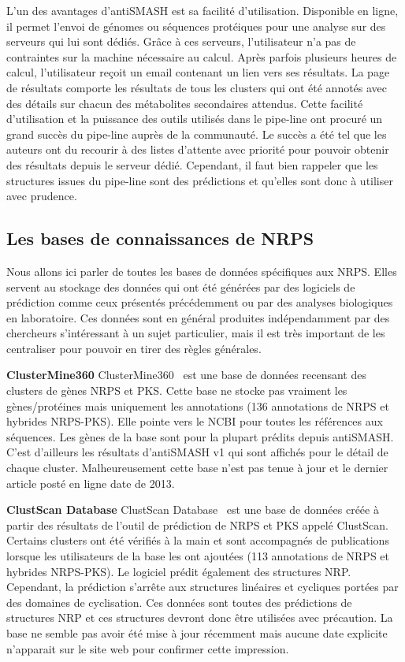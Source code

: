 L'un des avantages d'antiSMASH est sa facilité d'utilisation.
Disponible en ligne, il permet l'envoi de génomes ou séquences protéiques pour une analyse sur des serveurs qui lui sont dédiés.
Grâce à ces serveurs, l'utilisateur n'a pas de contraintes sur la machine nécessaire au calcul.
Après parfois plusieurs heures de calcul, l'utilisateur reçoit un email contenant un lien vers ses résultats.
La page de résultats comporte les résultats de tous les clusters qui ont été annotés avec des détails sur chacun des métabolites secondaires attendus.
Cette facilité d'utilisation et la puissance des outils utilisés dans le pipe-line ont procuré un grand succès du pipe-line auprès de la communauté.
Le succès a été tel que les auteurs ont du recourir à des listes d'attente avec priorité pour pouvoir obtenir des résultats depuis le serveur dédié.
Cependant, il faut bien rappeler que les structures issues du pipe-line sont des prédictions et qu'elles sont donc à utiliser avec prudence.



\subsection{Les bases de connaissances de NRPS}

Nous allons ici parler de toutes les bases de données spécifiques aux NRPS.
Elles servent au stockage des données qui ont été générées par des logiciels de prédiction comme ceux présentés précédemment ou par des analyses biologiques en laboratoire.
Ces données sont en général produites indépendamment par des chercheurs s'intéressant à un sujet particulier, mais il est très important de les centraliser pour pouvoir en tirer des règles générales.

\textbf{ClusterMine360}
ClusterMine360~\cite{conway_clustermine360:_2013} est une base de données recensant des clusters de gènes NRPS et PKS.
Cette base ne stocke pas vraiment les gènes/protéines mais uniquement les annotations (136 annotations de NRPS et hybrides NRPS-PKS).
Elle pointe vers le NCBI pour toutes les références aux séquences.
Les gènes de la base sont pour la plupart prédits depuis antiSMASH.
C'est d'ailleurs les résultats d'antiSMASH v1 qui sont affichés pour le détail de chaque cluster.
Malheureusement cette base n'est pas tenue à jour et le dernier article posté en ligne date de 2013.


\textbf{ClustScan Database}
ClustScan Database~\cite{diminic_databases_2013} est une base de données créée à partir des résultats de l'outil de prédiction de NRPS et PKS appelé ClustScan.
Certains clusters ont été vérifiés à la main et sont accompagnés de publications lorsque les utilisateurs de la base les ont ajoutées (113 annotations de NRPS et hybrides NRPS-PKS).
Le logiciel prédit également des structures NRP.
Cependant, la prédiction s'arrête aux structures linéaires et cycliques portées par des domaines de cyclisation.
Ces données sont toutes des prédictions de structures NRP et ces structures devront donc être utilisées avec précaution.
La base ne semble pas avoir été mise à jour récemment mais aucune date explicite n'apparait sur le site web pour confirmer cette impression.


